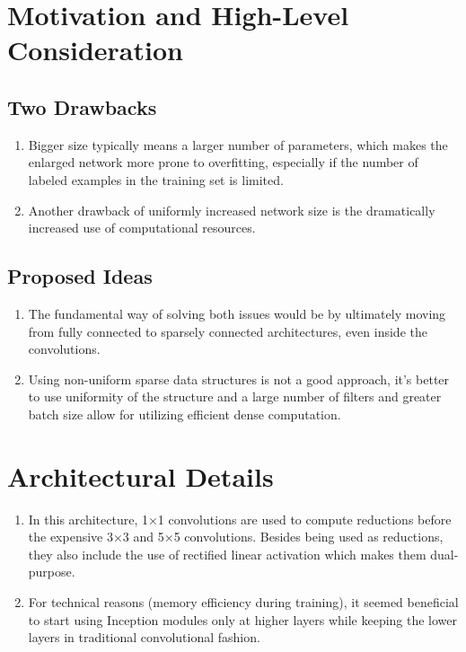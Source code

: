 \documentclass[12pt]{article}
\begin{document}
\section{Motivation and High-Level Consideration} 
\subsection{Two Drawbacks}
\begin{enumerate}
    \item Bigger size typically means a larger number of parameters, which makes the enlarged network more prone to overfitting, especially if the number of labeled examples in the training set is limited.
    \item Another drawback of uniformly increased network size is the dramatically increased use of computational resources.
\end{enumerate}

\subsection{Proposed Ideas}
\begin{enumerate}
    \item The fundamental way of solving both issues would be by ultimately moving from fully connected to sparsely connected architectures, even inside the convolutions.
    \item Using non-uniform sparse data structures is not a good approach, it's better to use uniformity of the structure and a large number of filters and greater batch size allow for utilizing efficient dense computation.
\end{enumerate}

\section{Architectural Details}
\begin{enumerate}
    \item In this architecture, 1×1 convolutions are used to compute reductions before the expensive 3×3 and 5×5 convolutions. Besides being used as reductions, they also include the use of rectified linear activation which makes them dual-purpose.
    \item For technical reasons (memory efficiency during training), it seemed beneficial to start using Inception modules only at higher layers while keeping the lower layers in traditional convolutional fashion.
\end{enumerate}
\end{document}
